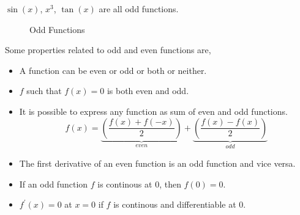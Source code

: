 \begin{example}
    \(\sin(x)\), \(x^3\), \(\tan(x)\) are all odd functions.

    \begin{figure}[H]
        \begin{subfigure}{.3\textwidth}
    \end{subfigure}%
    \begin{subfigure}{.3\textwidth}
    \end{subfigure}%
    \begin{subfigure}{.3\textwidth}
    \end{subfigure}%
    \caption{Odd Functions}
    \end{figure}

\end{example}

\begin{proposition}
    Some properties related to odd and even functions are,
    \begin{itemize}
        \item A function can be even or odd or both or neither.
        \item \(f\) such that \(f(x) = 0\) is both even and odd.
        \item It is possible to express any function as sum of even and odd functions. \[
          f(x) = \underbrace{\left( \frac{f(x) + f(-x)}{2}\right)}_{even} + \underbrace{\left( \frac{f(x) - f(x)}{2} \right)}_{odd}  
        \]
        \item The first derivative of an even function is an odd function and vice versa.
        \item If an odd function \(f\) is continous at \(0\), then \(f(0) = 0\). 
        \item \(f^{\prime}(x) = 0\) at \(x = 0\) if \(f\) is continous and differentiable at \(0\). 
    \end{itemize}    
\end{proposition}

